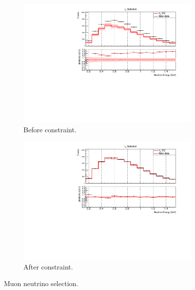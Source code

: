 \begin{figure}[H] 
\begin{center}
    \begin{subfigure}[b]{0.45\textwidth}
    \centering
    \includegraphics[width=1.00\textwidth]{Fakedata/set5/nue_numu_reco_e_H1_mc_fakedata_set5_numu_before_data_constraint.pdf}
    \caption{\label{fig:fakedata:set5:numu_before_constrain} Before constraint.}
    \end{subfigure}
    \begin{subfigure}[b]{0.45\textwidth}
    \centering
    \includegraphics[width=1.00\textwidth]{Fakedata/set5/nue_numu_reco_e_H1_mc_fakedata_set5_scaled_numu.pdf}
    \caption{\label{fig:fakedata:set5:numu_after_constrain} After constraint.}
    \end{subfigure}
\caption{\label{fig:fakedata:set5:numu_const} Muon neutrino selection.}
\end{center}
\end{figure}

